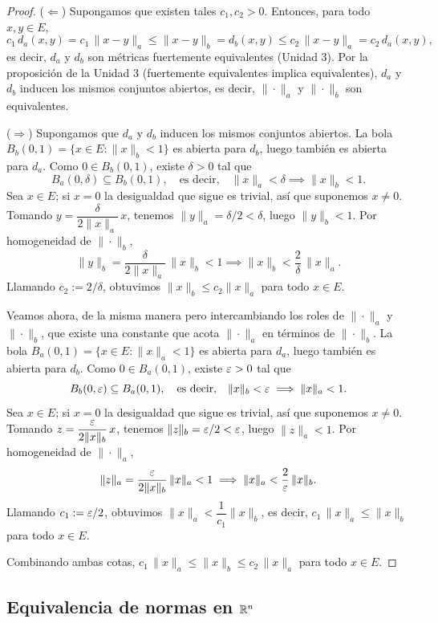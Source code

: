 \begin{proof}
($\Leftarrow$) Supongamos que existen tales $c_1,c_2>0$. Entonces, para
todo $x,y\in E$,
\[
c_1\,d_a(x,y) = c_1\,\|x-y\|_a \le \|x-y\|_b = d_b(x,y)
\le c_2\,\|x-y\|_a = c_2\,d_a(x,y),
\]
es decir, $d_a$ y $d_b$ son métricas fuertemente equivalentes (Unidad
3). Por la proposición de la Unidad 3 (fuertemente equivalentes implica
equivalentes), $d_a$ y $d_b$ inducen los mismos conjuntos abiertos, es
decir, $\|\cdot\|_a$ y $\|\cdot\|_b$ son equivalentes.

($\Rightarrow$) Supongamos que $d_a$ y $d_b$ inducen los mismos
conjuntos abiertos. La bola $B_b(0,1)=\{x\in E:\|x\|_b<1\}$ es abierta
para $d_b$, luego también es abierta para $d_a$. Como $0\in B_b(0,1)$,
existe $\delta>0$ tal que
\[
B_a(0,\delta) \subseteq B_b(0,1), \quad \text{es decir,} \quad
\|x\|_a<\delta \implies \|x\|_b<1.
\]
Sea $x\in E$; si $x=0$ la desigualdad que sigue es trivial, así que
suponemos $x\ne0$. Tomando $y=\dfrac{\delta}{2\|x\|_a}\,x$, tenemos
$\|y\|_a=\delta/2<\delta$, luego $\|y\|_b<1$. Por homogeneidad de
$\|\cdot\|_b$,
\[
\|y\|_b = \frac{\delta}{2\|x\|_a}\,\|x\|_b < 1
\implies \|x\|_b < \frac{2}{\delta}\,\|x\|_a.
\]
Llamando $c_2:=2/\delta$, obtuvimos $\|x\|_b\le c_2\|x\|_a$ para todo
$x\in E$.

Veamos ahora, de la misma manera pero intercambiando los roles de
$\|\cdot\|_a$ y $\|\cdot\|_b$, que existe una constante que acota
$\|\cdot\|_a$ en términos de $\|\cdot\|_b$. La bola
$B_a(0,1)=\{x\in E:\|x\|_a<1\}$ es abierta para $d_a$, luego también es
abierta para $d_b$. Como $0\in B_a(0,1)$, existe $\varepsilon>0$ tal que
\[
B_b(0,\varepsilon) \subseteq B_a(0,1), \quad \text{es decir,} \quad
\|x\|_b<\varepsilon \implies \|x\|_a<1.
\]
Sea $x\in E$; si $x=0$ la desigualdad que sigue es trivial, así que
suponemos $x\ne0$. Tomando $z=\dfrac{\varepsilon}{2\|x\|_b}\,x$, tenemos
$\|z\|_b=\varepsilon/2<\varepsilon$, luego $\|z\|_a<1$. Por homogeneidad de
$\|\cdot\|_a$,
\[
\|z\|_a = \frac{\varepsilon}{2\|x\|_b}\,\|x\|_a < 1
\implies \|x\|_a < \frac{2}{\varepsilon}\,\|x\|_b.
\]
Llamando $c_1:=\varepsilon/2$, obtuvimos $\|x\|_a < \dfrac{1}{c_1}\|x\|_b$,
es decir, $c_1\,\|x\|_a \le \|x\|_b$ para todo $x\in E$.

Combinando ambas cotas, $c_1\,\|x\|_a \le \|x\|_b \le c_2\,\|x\|_a$
para todo $x\in E$.
\end{proof}

\subsection{Equivalencia de normas en $\mathbb{R}^n$}

